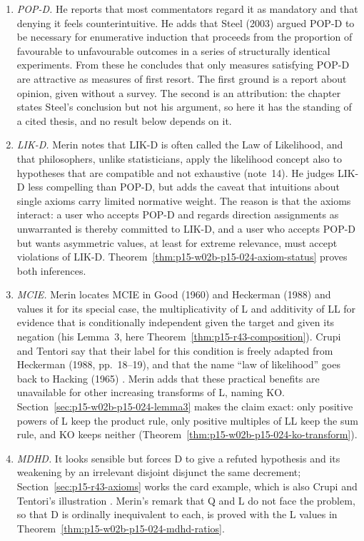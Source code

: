 \begin{enumerate}
\item \emph{POP-D.} He reports that most commentators regard it as
  mandatory and that denying it feels counterintuitive. He adds that
  Steel (2003) argued POP-D to be necessary for enumerative induction
  that proceeds from the proportion of favourable to unfavourable
  outcomes in a series of structurally identical experiments. From
  these he concludes that only measures satisfying POP-D are attractive
  as measures of first resort. The first ground is a report about
  opinion, given without a survey. The second is an attribution: the
  chapter states Steel's conclusion but not his argument, so here it
  has the standing of a cited thesis, and no result below depends on it.
\item \emph{LIK-D.} Merin notes that LIK-D is often called the Law of
  Likelihood, and that philosophers, unlike statisticians, apply the
  likelihood concept also to hypotheses that are compatible and not
  exhaustive (note~14). He judges LIK-D less compelling than POP-D, but
  adds the caveat that intuitions about single axioms carry limited
  normative weight. The reason is that the axioms interact: a user who
  accepts POP-D and regards direction assignments as unwarranted is
  thereby committed to LIK-D, and a user who accepts POP-D but wants
  asymmetric values, at least for extreme relevance, must accept
  violations of LIK-D. Theorem~\ref{thm:p15-w02b-p15-024-axiom-status}
  proves both inferences.
\item \emph{MCIE.} Merin locates MCIE in Good (1960) and Heckerman
  (1988) and values it for its special case, the multiplicativity of L
  and additivity of LL for evidence that is conditionally independent
  given the target and given its negation (his Lemma~3, here
  Theorem~\ref{thm:p15-r43-composition}). Crupi and Tentori say that
  their label for this condition is freely adapted from Heckerman (1988,
  pp.~18--19), and that the name ``law of likelihood'' goes back to
  Hacking (1965) \cite[p.~655, n.~7]{CrupiTentori2016Confirmation}.
  Merin adds that these practical benefits are unavailable for other
  increasing transforms of L, naming KO. Section~\ref{sec:p15-w02b-p15-024-lemma3}
  makes the claim exact: only positive powers of L keep the product
  rule, only positive multiples of LL keep the sum rule, and KO keeps
  neither (Theorem~\ref{thm:p15-w02b-p15-024-ko-transform}).
\item \emph{MDHD.} It looks sensible but forces D to give a refuted
  hypothesis and its weakening by an irrelevant disjoint disjunct the
  same decrement; Section~\ref{sec:p15-r43-axioms} works the card
  example, which is also Crupi and Tentori's illustration
  \cite[p.~657]{CrupiTentori2016Confirmation}. Merin's remark that Q
  and L do not face the problem, so that D is ordinally inequivalent
  to each, is proved with the L values in
  Theorem~\ref{thm:p15-w02b-p15-024-mdhd-ratios}.
\end{enumerate}

